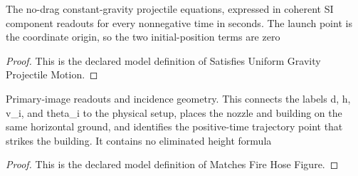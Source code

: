 \begin{definition}
  \label{def:physics:phyx-mini-0683:phyxminiproblems-problemphyxmini0683-satisfiesuniformgravityprojectilemotion}
  The no-drag constant-gravity projectile equations, expressed in coherent SI component readouts for every nonnegative time in seconds. The launch point is the coordinate origin, so the two initial-position terms are zero
\end{definition}
\begin{proof}
  This is the declared model definition of Satisfies Uniform Gravity Projectile Motion.
\end{proof}
\begin{definition}
  \label{def:physics:phyx-mini-0683:phyxminiproblems-problemphyxmini0683-matchesfirehosefigure}
  Primary-image readouts and incidence geometry. This connects the labels d, h, v\_i, and theta\_i to the physical setup, places the nozzle and building on the same horizontal ground, and identifies the positive-time trajectory point that strikes the building. It contains no eliminated height formula
\end{definition}
\begin{proof}
  This is the declared model definition of Matches Fire Hose Figure.
\end{proof}
